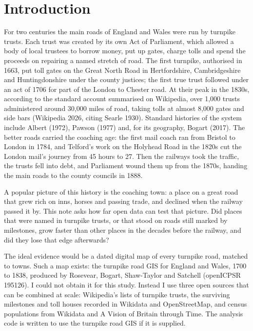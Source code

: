 \documentclass[11pt,a4paper]{article}
\begin{document}
\section{Introduction}

For two centuries the main roads of England and Wales were run by turnpike trusts. Each trust was created by its own Act of Parliament, which allowed a body of local trustees to borrow money, put up gates, charge tolls and spend the proceeds on repairing a named stretch of road. The first turnpike, authorised in 1663, put toll gates on the Great North Road in Hertfordshire, Cambridgeshire and Huntingdonshire under the county justices; the first true trust followed under an act of 1706 for part of the London to Chester road. At their peak in the 1830s, according to the standard account summarised on Wikipedia, over 1,000 trusts administered around 30,000 miles of road, taking tolls at almost 8,000 gates and side bars (Wikipedia 2026, citing Searle 1930). Standard histories of the system include Albert (1972), Pawson (1977) and, for its geography, Bogart (2017). The better roads carried the coaching age: the first mail coach ran from Bristol to London in 1784, and Telford's work on the Holyhead Road in the 1820s cut the London mail's journey from 45 hours to 27. Then the railways took the traffic, the trusts fell into debt, and Parliament wound them up from the 1870s, handing the main roads to the county councils in 1888.

A popular picture of this history is the coaching town: a place on a great road that grew rich on inns, horses and passing trade, and declined when the railway passed it by. This note asks how far open data can test that picture. Did places that were named in turnpike trusts, or that stood on roads still marked by milestones, grow faster than other places in the decades before the railway, and did they lose that edge afterwards?

The ideal evidence would be a dated digital map of every turnpike road, matched to towns. Such a map exists: the turnpike road GIS for England and Wales, 1700 to 1838, produced by Rosevear, Bogart, Shaw-Taylor and Satchell (openICPSR 195126). I could not obtain it for this study. Instead I use three open sources that can be combined at scale: Wikipedia's lists of turnpike trusts, the surviving milestones and toll houses recorded in Wikidata and OpenStreetMap, and census populations from Wikidata and A Vision of Britain through Time. The analysis code is written to use the turnpike road GIS if it is supplied.
\end{document}
